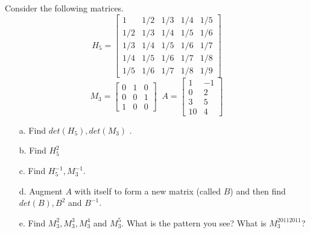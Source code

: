 {Consider the following matrices.
\[
H_5
=
\left[
\begin{array}{ccccc}
1 & 1/2 & 1/3 & 1/4 & 1/5\\
1/2 & 1/3 & 1/4 & 1/5 & 1/6\\
1/3 & 1/4 & 1/5 & 1/6 &  1/7\\
1/4 & 1/5 & 1/6 & 1/7 & 1/8\\
1/5 & 1/6 & 1/7 & 1/8 & 1/9
\end{array}
\right]
\]
\[
M_3
=
\left[
\begin{array}{ccc}
0 & 1 & 0\\
0 & 0 & 1\\ 
1 & 0 &  0
\end{array}
\right]
\; \;
A
=
\left[
\begin{array}{cc}
1 & -1 \\
0 & 2 \\ 
3 & 5 \\
10 & 4
\end{array}
\right]
\]

\begin{enumerate}
\item[a.] Find $det(H_5), det(M_3)$ .
\item[b.] Find $H_5^2$ 
\item[c.] Find $H_5^{-1}, M_3^{-1}$.
\item[d.] Augment $A$ with itself to form a new matrix (called $B$) and then find $det(B), B^2$ and $B^{-1}$. 
\item[e.] Find $M_3^2, M_3^3, M_3^4$ and $M_3^5$.  What is the pattern you see?  What is $M_3^{20112011}$? 
\end{enumerate}}
{}
